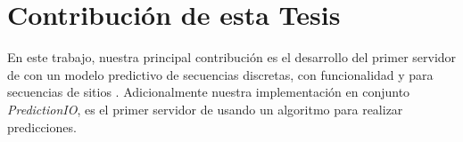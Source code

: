 

\section{Contribución de esta Tesis}


En este trabajo,  nuestra principal contribución es el desarrollo del primer servidor de \machinelearning con un modelo predictivo de secuencias discretas, con funcionalidad \online y \offline para secuencias de  sitios \web. Adicionalmente nuestra implementación en conjunto \emph{PredictionIO}, es el primer servidor de \machinelearning usando un algoritmo \losslessdatacompression para realizar predicciones.



